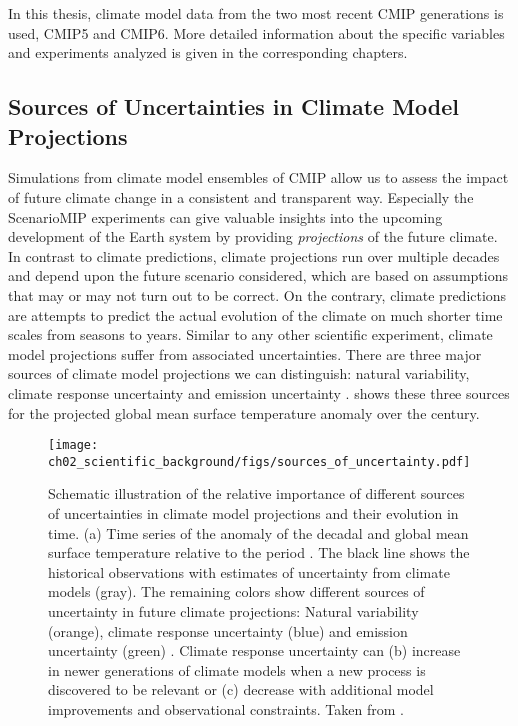 In this thesis, climate model data from the two most recent \ac{CMIP}
generations is used, \acs{CMIP}5 and \acs{CMIP}6. More detailed information
about the specific variables and experiments analyzed is given in the
corresponding chapters.


\subsection{Sources of Uncertainties in Climate Model Projections}
\label{subsec:02:source_of_uncertainties}

Simulations from climate model ensembles of \ac{CMIP} allow us to assess the
impact of future climate change in a consistent and transparent way. Especially
the \ac{ScenarioMIP} experiments can give valuable insights into the upcoming
development of the Earth system by providing \emph{projections} of the future
climate. In contrast to climate predictions, climate projections run over
multiple decades and depend upon the future scenario considered, which are
based on assumptions that may or may not turn out to be correct. On the
contrary, climate predictions are attempts to predict the actual evolution of
the climate on much shorter time scales from seasons to years. Similar to any
other scientific experiment, climate model projections suffer from associated
uncertainties. There are three major sources of climate model projections we
can distinguish: natural variability, climate response uncertainty and emission
uncertainty \autocite{Hawkins2009, Hawkins2010}.
 shows these three sources for the
projected global mean surface temperature anomaly over the  century.

\begin{figure}[t]
  \centering
  \texttt{[image: 
    ch02\_scientific\_background/figs/sources\_of\_uncertainty.pdf]}
  \caption{Schematic illustration of the relative importance of different
    sources of uncertainties in climate model projections and their evolution
    in time. (a) Time series of the anomaly of the decadal and global mean
    surface temperature relative to the period . The black
    line shows the historical observations with estimates of uncertainty from
    climate models (gray). The remaining colors show different sources of
    uncertainty in future climate projections: Natural variability
    (orange), climate response uncertainty (blue) and emission uncertainty
    (green) \autocite{Hawkins2009, Hawkins2010}. Climate response uncertainty
    can (b) increase in newer generations of climate models when a new process
    is discovered to be relevant or (c) decrease with additional model
    improvements and observational constraints. Taken from
    \textcite{Cubasch2013}.}
  \label{fig:02:sources_of_uncertainty}
\end{figure}

